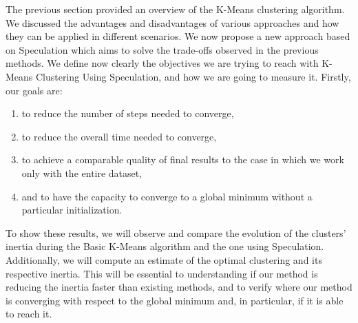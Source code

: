 The previous section provided an overview of the K-Means clustering algorithm. We discussed the advantages and disadvantages of various approaches and how they can be applied in different scenarios. We now propose a new approach based on Speculation which aims to solve the trade-offs observed in the previous methods.
We define now clearly the objectives we are trying to reach with K-Means Clustering Using Speculation, and how we are going to measure it.
Firstly, our goals are:
\begin{enumerate}
    \item to reduce the number of steps needed to converge,
    \item to reduce the overall time needed to converge,
    \item to achieve a comparable quality of final results to the case in which we work only with the entire dataset,
    \item and to have the capacity to converge to a global minimum without a particular initialization.
\end{enumerate}
To show these results, we will observe and compare the evolution of the clusters' inertia during the Basic K-Means algorithm and the one using Speculation. Additionally, we will compute an estimate of the optimal clustering and its respective inertia.
This will be essential to understanding if our method is reducing the inertia faster than existing methods, and to verify where our method is converging with respect to the global minimum and, in particular, if it is able to reach it.
